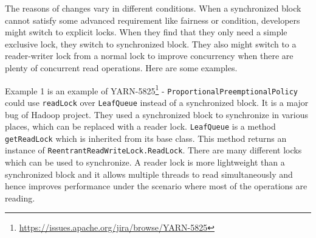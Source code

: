 
The reasons of changes vary in different conditions. When a synchronized block cannot satisfy some advanced requirement like fairness or condition, developers might switch to explicit locks. When they find that they only need a simple exclusive lock, they switch to synchronized block. They also might switch to a reader-writer lock \cite{journals/cacm/CouroisHP71} from a normal lock to improve concurrency when there are plenty of concurrent read operations. Here are some examples.


Example 1 is an example of YARN-5825\footnote{\url{https://issues.apache.org/jira/browse/YARN-5825}} - \texttt{ProportionalPreemptionalPolicy} could use \texttt{readLock} over \texttt{LeafQueue} instead of a synchronized block. It is a major bug of Hadoop project. They used a synchronized block to synchronize in various places, which can be replaced with a reader lock. \texttt{LeafQueue} is a method \texttt{getReadLock} which is inherited from its base class. This method returns an instance of \texttt{ReentrantReadWriteLock.ReadLock}. There are many different locks which can be used to synchronize. A reader lock is more lightweight than a synchronized block and it allows multiple threads to read simultaneously and hence improves performance under the scenario where most of the operations are reading.



